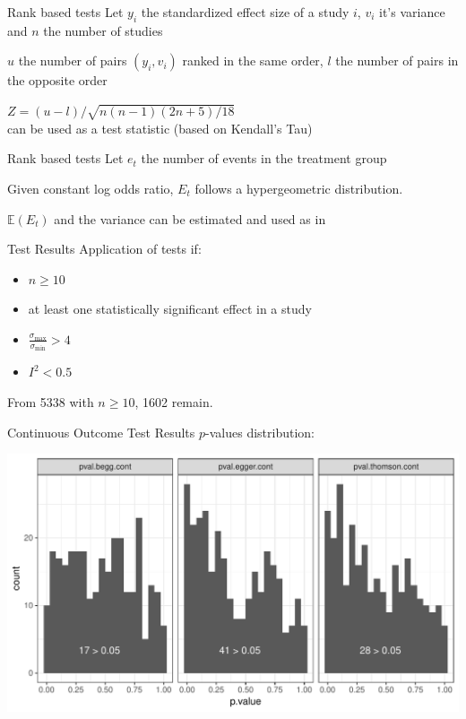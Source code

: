 \documentclass[english]{beamer}\usepackage[]{graphicx}\usepackage[]{color}
\makeatletter
\def\maxwidth{ %
  \ifdim\Gin@nat@width>\linewidth
    \linewidth
  \else
    \Gin@nat@width
  \fi
}
\newenvironment{knitrout}{}{} %
\makeatother
\begin{document}
\begin{frame}{Rank based tests}
\citet{begg.ties}
Let $y_{i}$ the standardized effect size of a study $i$, $v_{i}$ it's variance and $n$ the number of studies

$u$ the number of pairs $(y_{i}, v_{i})$ ranked in the same order, $l$
the number of pairs in the opposite order

$Z = (u - l)/\sqrt{n(n-1)(2n + 5)/18}$ \\ can be used as a test statistic (based on Kendall's Tau)
\end{frame}

\begin{frame}{Rank based tests}
\citet{Schwarzer}
Let $e_{t}$ the number of events in the treatment group

Given constant log odds ratio, $E_{t}$ follows a hypergeometric distribution.

$\mathbb{E}(E_{t})$ and the variance can be estimated and used as in 
\citet{begg.ties}
\end{frame}


\begin{frame}{Test Results}
Application of tests if:
\begin{itemize}
\item $n \geq 10$
\item at least one statistically significant effect in a study
\item $\frac{\sigma_{\textrm{max}}}{\sigma_{\textrm{min}}} > 4$
\item $I^2 < 0.5$
\end{itemize}

From 5338 with $n \geq 10$, 1602 remain.
\end{frame}

% 

\begin{frame}[fragile]{Continuous Outcome Test Results}
$p$-values distribution:

\begin{knitrout}
\color{fgcolor}
\includegraphics[width=\maxwidth]{figure/unnamed-chunk-10-1} 

\end{knitrout}
\end{frame}
\end{document}
